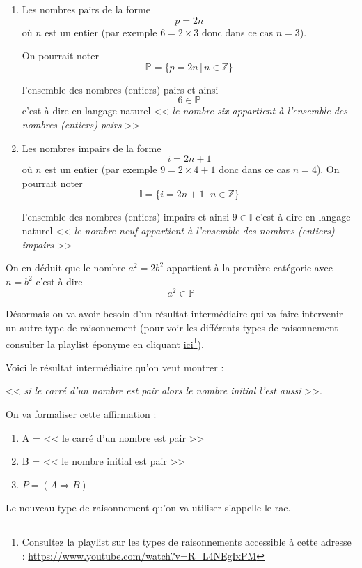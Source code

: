 \documentclass[a4paper,11pt]{book}
\begin{document}
\begin{enumerate}
\item Les nombres pairs de la forme \[p = 2n\] où \(n\) est un entier
(par exemple \(6 = 2\times 3\) donc dans ce cas \(n = 3\)).

On pourrait noter
\[\mathbb{P} = \{ p = 2n\, |\, n\in\mathbb{Z}\}\]

l'ensemble des nombres (entiers)
pairs et ainsi \[6\in\mathbb{P}\]
c'est-à-dire en langage naturel
<< \emph{le nombre six appartient à l'ensemble des nombres (entiers) pairs} >>
\item Les nombres impairs de la forme \[i = 2n + 1\] où \(n\) est un
entier (par exemple \(9 = 2\times 4 + 1\) donc dans ce cas \(n = 4\)).
On pourrait noter
\[\mathbb{I} = \{ i = 2n + 1\,|\, n\in\mathbb{Z}\}\]

l'ensemble des nombres (entiers)
impairs et ainsi \(9\in\mathbb{I}\)
c'est-à-dire en langage naturel
<< \emph{le nombre neuf appartient à l'ensemble des nombres (entiers) impairs} >>
\end{enumerate}

On en déduit que le nombre \(a^2 = 2b^2\) appartient à la première
catégorie avec \(n = b^2\) c'est-à-dire \[a^2\in\mathbb{P}\]

Désormais on va avoir besoin d'un résultat intermédiaire qui va
faire intervenir un autre type de raisonnement (pour voir les
différents types de raisonnement consulter la playlist éponyme en
cliquant \href{https://youtu.be/R\_L4NEgIxPM?si=5kVsC2Tq9BKLcsv-}{ici}\footnote{Consultez la playlist sur les types de
raisonnements accessible à cette adresse :
\url{https://www.youtube.com/watch?v=R\_L4NEgIxPM}}).


Voici le résultat intermédiaire qu'on veut montrer :

<< \emph{si le carré d'un nombre est pair alors le nombre initial l'est aussi} >>.

On va formaliser cette affirmation :

\begin{enumerate}
\item A = << le carré d'un nombre est pair >>
\item B = << le nombre initial est pair >>
\item \(P = (A \Rightarrow B)\)
\end{enumerate}

Le nouveau type de raisonnement qu'on va utiliser s'appelle le
\gls{rac}.
\end{document}
